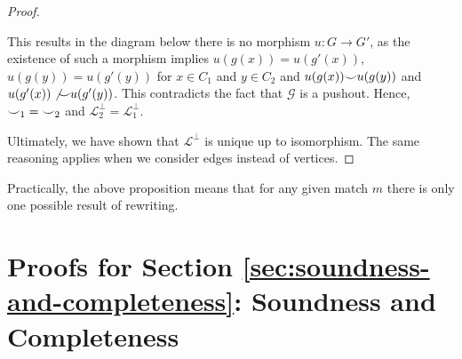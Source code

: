 \begin{proof}
\begin{itemize}
              This results in the diagram below there is no morphism $u : G \to G'$, as the existence of such a morphism implies $u(g(x)) = u(g'(x))$, $u(g(y)) = u(g'(y))$ for $x \in C_1$ and $y \in C_2$ and $u(g(x)) {\smile} u(g(y))$ and $u(g'(x)) \not {\smile} u(g'(y))$.
              This contradicts the fact that $\mathcal{G}$ is a pushout.
              Hence, ${\smile}_{1} = {\smile}_{2}$ and $\mathcal{L}_{2}^{\bot} = \mathcal{L}_{1}^{\bot}$.
    \end{itemize}
    Ultimately, we have shown that $\mathcal{L}^{\bot}$ is unique up to isomorphism.
    The same reasoning applies when we consider edges instead of vertices.
\end{proof}

Practically, the above proposition means that for any given match $m$ there is only one possible result of rewriting.




\ifdefined\ONECOLUMN
\section{Proofs for Section \ref{sec:soundness-and-completeness}: Soundness and Completeness}
\else
